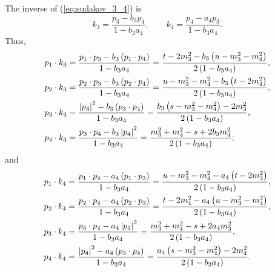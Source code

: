 The inverse of (\ref{eq:sudakov_3_4}) is
\begin{equation}
	k_{3} = \frac{p_{3} - b_{3} p_{4}}{1 - b_{3} a_{4}}, \qquad k_{4} = \frac{p_{4} - a_{4} p_{3}}{1 - b_{3} a_{4}}.
\end{equation}
Thus,
\begin{align}
	p_{1} \cdot k_{3} &= \frac{p_{1} \cdot p_{3} - b_{3} \left( p_{1} \cdot p_{4} \right)}{1 - b_{3} a_{4}} = \frac{ t - 2m_{3}^{2} - b_{3} \left( u - m_{3}^{2} - m_{4}^{2} \right) }{2 \left(1 - b_{3} a_{4} \right)}, \\
	p_{2} \cdot k_{3} &= \frac{p_{2} \cdot p_{3} - b_{3} \left( p_{2} \cdot p_{4} \right)}{1 - b_{3} a_{4}} = \frac{ u - m_{3}^{2} - m_{4}^{2} - b_{3} \left( t - 2m_{4}^{2} \right) }{2 \left(1 - b_{3} a_{4} \right)}, \\
	p_{3} \cdot k_{3} &= \frac{\left\lvert p_{3} \right\rvert^{2} - b_{3} \left( p_{3} \cdot p_{4} \right)}{1 - b_{3} a_{4}} = \frac{ b_{3} \left( s - m_{3}^{2} - m_{4}^{2} \right) - 2m_{3}^{2} }{2 \left(1 - b_{3} a_{4} \right)}, \\
	p_{4} \cdot k_{3} &= \frac{p_{3} \cdot p_{4} - b_{3} \left\lvert p_{4} \right\rvert^{2}}{1 - b_{3} a_{4}} = \frac{ m_{3}^{2} + m_{4}^{2} - s + 2 b_{3} m_{4}^{2} }{2 \left(1 - b_{3} a_{4} \right)};
\end{align}
and
\begin{align}
	p_{1} \cdot k_{4} &= \frac{p_{1} \cdot p_{4} - a_{4} \left( p_{1} \cdot p_{3} \right)}{1 - b_{3} a_{4}} = \frac{u - m_{3}^{2} - m_{4}^{2} - a_{4} \left(t - 2 m_{3}^{2} \right)}{2 \left( 1 - b_{3} a_{4} \right)}, \\
	p_{2} \cdot k_{4} &= \frac{p_{2} \cdot p_{4} - a_{4} \left( p_{2} \cdot p_{3} \right)}{1 - b_{3} a_{4}} = \frac{t - 2m_{4}^{2} - a_{4} \left( u - m_{3}^{2} - m_{4}^{2} \right)}{2 \left( 1 - b_{3} a_{4} \right)}, \\
	p_{3} \cdot k_{4} &= \frac{p_{3} \cdot p_{4} - a_{4} \left\lvert p_{3} \right\rvert^{2}}{1 - b_{3} a_{4}} = \frac{m_{3}^{2} + m_{4}^{2} - s + 2 a_{4} m_{3}^{2}}{2 \left( 1 - b_{3} a_{4} \right)}, \\
	p_{4} \cdot k_{4} &= \frac{ \left\lvert p_{4} \right\rvert^{2} - a_{4} \left( p_{3} \cdot p_{4} \right)}{1 - b_{3} a_{4}} = \frac{a_{4} \left( s - m_{3}^{2} - m_{4}^{2} \right) - 2 m_{4}^{2}}{2 \left( 1 - b_{3} a_{4} \right)}.
\end{align}
